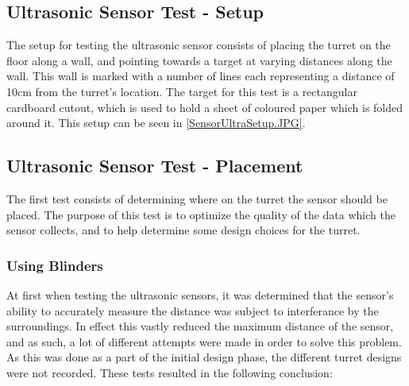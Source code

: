 
\subsection{Ultrasonic Sensor Test - Setup}\label{UltraTestSetup}
The setup for testing the ultrasonic sensor consists of placing the turret on
the floor along a wall, and pointing towards a target at varying distances along
the wall. This wall is marked with a number of lines each representing a
distance of 10cm from the turret's location. The target for this test is a
rectangular cardboard cutout, which is used to hold a sheet of coloured paper
which is folded around it. This setup can be seen in
\autoref{SensorUltraSetup.JPG}.


\subsection{Ultrasonic Sensor Test - Placement}\label{UltraTestPlacement}
The first test consists of determining where on the turret the sensor should be
placed. The purpose of this test is to optimize the quality of the data which
the sensor collects, and to help determine some design choices for the
turret.\nl


\subsubsection{Using Blinders}
At first when testing the ultrasonic sensors, it was determined that the
sensor's ability to accurately measure the distance was subject to interferance
by the surroundings. In effect this vastly reduced the maximum distance of the
sensor, and as such, a lot of different attempts were made in order to solve
this problem. As this was done as a part of the initial design phase, the
different turret designs were not recorded. These tests resulted in the
following conclusion:\nl

